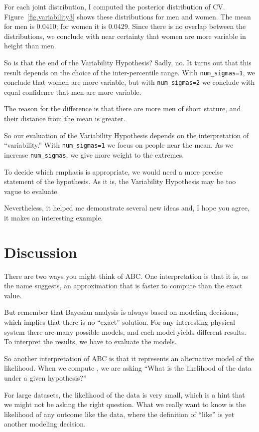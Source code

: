 \documentclass[12pt]{book}
\theoremstyle{exercise}
\begin{document}
For each joint distribution, I computed the posterior distribution of
CV.  Figure~\ref{fig.variability3} shows these distributions for men
and women.  The mean for men is 0.0410; for women it is 0.0429.
Since there is no overlap between the distributions, we conclude with
near certainty that
women are more variable in height than men.

So is that the end of the Variability Hypothesis?  Sadly, no.  It turns
out that this
result depends on the choice of the
inter-percentile range.  With \verb"num_sigmas=1", we conclude that
women are more variable, but with \verb"num_sigmas=2" we conclude
with equal confidence that men are more variable.

The reason for the difference is that there
are more men of short stature, and their distance from the mean is
greater.

So our evaluation of the Variability Hypothesis depends on the
interpretation of ``variability.''  With \verb"num_sigmas=1" we
focus on people near the mean.  As we increase
\verb"num_sigmas", we give more weight to the extremes.  

To decide which
emphasis is appropriate, we would need a more precise statement
of the hypothesis.  As it is, the Variability Hypothesis may be
too vague to evaluate.

Nevertheless, it helped
me demonstrate several new ideas and, I hope you agree,
it makes an interesting example.


\section{Discussion}

There are two ways you might think of ABC.  One interpretation
is that it is, as the name suggests, an approximation that is
faster to compute than the exact value.

But remember that Bayesian analysis is always
based on modeling decisions, which implies that there is no
``exact'' solution.  For any interesting
physical system there are many possible models, and each model
yields different results.  To interpret the results, we have to
evaluate the models.

So another interpretation of ABC is that it represents an alternative
model of the likelihood.  When we compute , we are asking
``What is the likelihood of the data under a given hypothesis?''

For large datasets, the likelihood of the data is very small, which
is a hint that we might not be asking the right question.  What
we really want to know is the likelihood of any outcome
like the data, where the definition of ``like'' is yet another
modeling decision.
\end{document}
